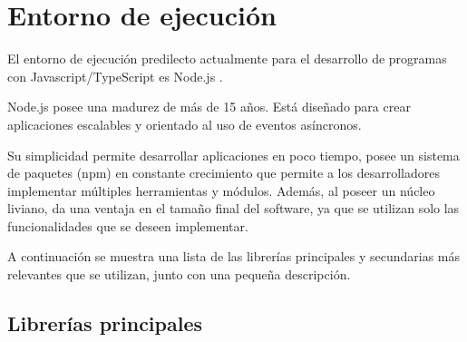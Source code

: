\documentclass[12pt,letterpaper,oneside]{report}
\begin{document}
\section{Entorno de ejecuci\'on}
\label{sec:entorno}

El entorno de ejecuci\'on predilecto actualmente para el desarrollo de programas con Javascript/TypeScript es Node.js \parencite{nodejs}.

Node.js posee una madurez de m\'as de 15 a\~nos. Est\'a dise\~nado para crear aplicaciones escalables y orientado al uso de eventos as\'incronos.

Su simplicidad permite desarrollar aplicaciones en poco tiempo, posee un sistema de paquetes (npm) en constante crecimiento que permite a los desarrolladores implementar m\'ultiples herramientas y m\'odulos. Adem\'as, al poseer un n\'ucleo liviano, da una ventaja en el tama\~no final del software, ya que se utilizan solo las funcionalidades que se deseen implementar.

A continuaci\'on se muestra una lista de las librer\'ias principales y secundarias m\'as relevantes que se utilizan, junto con una peque\~na descripci\'on.

\subsection{Librer\'ias principales}
\label{sec:librerias-principales}
\end{document}
